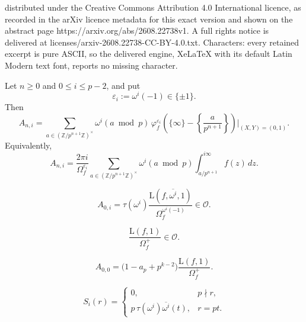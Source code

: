 \documentclass[10pt,a4paper]{amsart}
\newcommand{\Z}{\mathbb{Z}}
\begin{document}
distributed under the Creative Commons Attribution 4.0 International licence, as recorded in the arXiv licence metadata for this exact version and shown on the abstract page https://arxiv.org/abs/2608.22738v1. A full rights notice is delivered at licenses/arxiv-2608.22738-CC-BY-4.0.txt. Characters: every retained excerpt is pure ASCII, so the delivered engine, XeLaTeX with its default Latin Modern text font, reports no missing character.
\begin{lemma}
\label{lem:Ani-integral-formula}
Let \(n\geq0\) and \(0\leq i\leq p-2\), and put
\[
        \varepsilon_i:=\omega^i(-1)\in\{\pm1\}.
\]
Then
\begin{equation}
\label{eq:Ani-modular-symbol-formula}
        A_{n,i}
        =
        \sum_{a\in(\Z/p^{n+1}\Z)^\times}
        \omega^i(a\bmod p)\,
        \varphi_f^{\varepsilon_i}
        \left(
        \{\infty\}
        -
        \left\{\frac{a}{p^{n+1}}\right\}
        \right)\Big|_{(X,Y)=(0,1)}.
\end{equation}
Equivalently,
\begin{equation}
\label{eq:Ani-integral-formula}
        A_{n,i}
        =
        \frac{2\pi i}{\Omega_f^{\varepsilon_i}}
        \sum_{a\in(\Z/p^{n+1}\Z)^\times}
        \omega^i(a\bmod p)
        \int_{a/p^{n+1}}^{i\infty}f(z)\,dz.
\end{equation}
\end{lemma}

\begin{equation}
\label{eq:A0i-interpolation}
        A_{0,i}
        =
        \tau(\omega^i)
        \frac{\mathrm{L}(f,\overline{\omega^i},1)}
             {\Omega_f^{\omega^i(-1)}}
        \in\mathcal O.
\end{equation}

\begin{equation}
\label{eq:trivial-algebraic-integrality}
        \frac{\mathrm{L}(f,1)}{\Omega_f^+}
        \in\mathcal O.
\end{equation}

\begin{equation}
\label{eq:A00-bottom}
        A_{0,0}
        =
        \bigl(1-a_p+p^{k-2}\bigr)
        \frac{\mathrm{L}(f,1)}{\Omega_f^+}.
\end{equation}

\begin{equation}
\label{eq:p2-inflated-gauss-sum}
        S_i(r)
        =
        \begin{cases}
        0,&p\nmid r,\\[3pt]
        p\,\tau(\omega^i)\overline{\omega^i}(t),&r=pt.
        \end{cases}
\end{equation}
\end{document}
